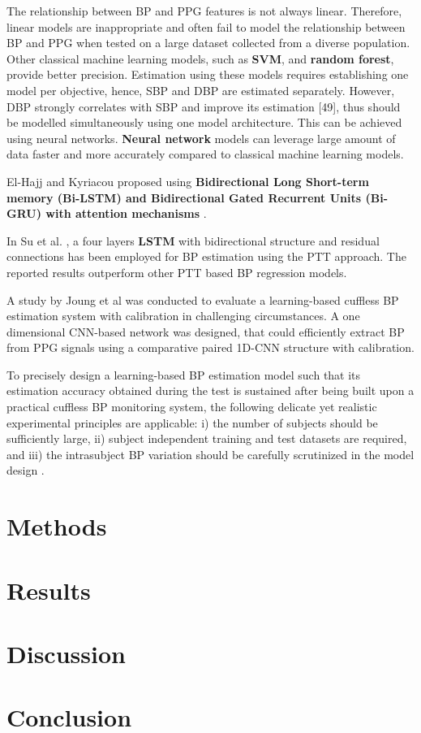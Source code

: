 \documentclass[10pt, bibliography=totoc]{scrartcl}
\begin{document}
The relationship between BP and PPG features is not always linear. Therefore, linear models are inappropriate and often fail to model the relationship between BP and PPG when tested on a large dataset collected from a diverse population. Other classical machine learning models, such as \textbf{SVM}, and \textbf{random forest}, provide better precision. Estimation using these models requires establishing one model per objective, hence, SBP and DBP are estimated separately. However, DBP strongly correlates with SBP and improve its estimation [49], thus should be modelled simultaneously using one model architecture. This can be achieved using neural networks. \textbf{Neural network} models can leverage large amount of data faster and more accurately compared to classical machine learning models.

El-Hajj and Kyriacou proposed using \textbf{Bidirectional Long Short-term memory (Bi-LSTM) and Bidirectional Gated Recurrent Units (Bi-GRU) with attention mechanisms} \cite{el-hajjDeepLearningModels2021}.

In Su et al. \cite{suLongtermBloodPressure2018}, a four layers \textbf{LSTM} with bidirectional structure and residual connections has been employed for BP estimation using the PTT approach. The reported results outperform other PTT based BP regression models.

A study by Joung et al \cite{joungContinuousCufflessBlood2023} was conducted to evaluate a learning-based cuffless BP estimation system with calibration in challenging circumstances. A one dimensional CNN-based network was designed, that could efficiently extract BP from PPG signals using a comparative paired 1D-CNN structure with calibration. 

To precisely design a learning-based BP estimation model such that its estimation accuracy obtained during the test is sustained after being built upon a practical cuffless BP monitoring system, the following delicate yet realistic experimental principles are applicable: i) the number of subjects should be sufficiently large, ii) subject independent training and test datasets are required, and iii) the intrasubject BP variation should be carefully scrutinized in the model design \cite{joungContinuousCufflessBlood2023}.

\section{Methods}
\section{Results}
\section{Discussion}
\section{Conclusion}



\end{document}
